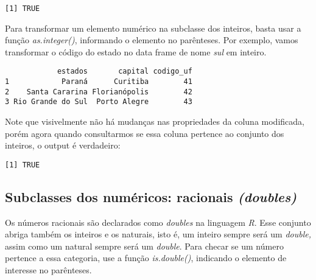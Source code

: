 \documentclass[
  letterpaper,
  DIV=11,
  numbers=noendperiod]{scrreprt}
\newenvironment{Shaded}{\begin{snugshade}}{\end{snugshade}}
\newcommand{\FunctionTok}[1]{\textcolor[rgb]{0.28,0.35,0.67}{#1}}
\newcommand{\NormalTok}[1]{\textcolor[rgb]{0.00,0.23,0.31}{#1}}
\newcommand{\OtherTok}[1]{\textcolor[rgb]{0.00,0.23,0.31}{#1}}
\newcommand{\SpecialCharTok}[1]{\textcolor[rgb]{0.37,0.37,0.37}{#1}}
\begin{document}
\begin{verbatim}
[1] TRUE
\end{verbatim}

Para transformar um elemento numérico na subclasse dos inteiros, basta
usar a função \emph{as.integer()}, informando o elemento no parênteses.
Por exemplo, vamos transformar o código do estado no data frame de nome
\emph{sul} em inteiro.

\begin{Shaded}
\end{Shaded}

\begin{verbatim}
            estados       capital codigo_uf
1            Paraná      Curitiba        41
2    Santa Cararina Florianópolis        42
3 Rio Grande do Sul  Porto Alegre        43
\end{verbatim}

Note que visivelmente não há mudanças nas propriedades da coluna
modificada, porém agora quando consultarmos se essa coluna pertence ao
conjunto dos inteiros, o output é verdadeiro:

\begin{Shaded}
\end{Shaded}

\begin{verbatim}
[1] TRUE
\end{verbatim}

\subsection{\texorpdfstring{Subclasses dos numéricos: racionais
\emph{(doubles)}}{Subclasses dos numéricos: racionais (doubles)}}\label{subclasses-dos-numuxe9ricos-racionais-doubles}

Os números racionais são declarados como \emph{doubles} na linguagem
\emph{R}. Esse conjunto abriga também os inteiros e os naturais, isto é,
um inteiro sempre será um \emph{double,} assim como um natural sempre
será um \emph{double}. Para checar se um número pertence a essa
categoria, use a função \emph{is.double()}, indicando o elemento de
interesse no parênteses.
\end{document}
